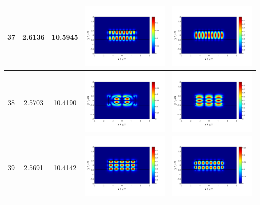 \documentclass{assignment}
\begin{document}
\begin{sol}
\begin{itemize}
\begin{longtable}[c]{|c|c|c|c|c|}
            37 & 2.6136 & 10.5945 & \includegraphics[width=.3\columnwidth]{Assignment-2-mode-37-Ex.png} & \includegraphics[width=.3\columnwidth]{Assignment-2-mode-37-Ey.png} \\ \hline
            38 & 2.5703 & 10.4190 & \includegraphics[width=.3\columnwidth]{Assignment-2-mode-38-Ex.png} & \includegraphics[width=.3\columnwidth]{Assignment-2-mode-38-Ey.png} \\ \hline
            39 & 2.5691 & 10.4142 & \includegraphics[width=.3\columnwidth]{Assignment-2-mode-39-Ex.png} & \includegraphics[width=.3\columnwidth]{Assignment-2-mode-39-Ey.png} \\ \hline

\end{longtable}
\end{itemize}
\end{sol}
\end{document}
